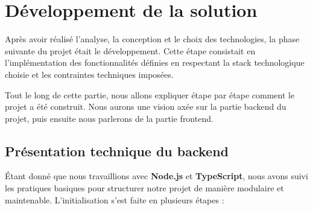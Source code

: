 \section{Développement de la solution} \label{developement_solution}

Après avoir réalisé l’analyse, la conception et le choix des technologies, la phase suivante du projet était le développement. Cette étape consistait en l’implémentation des fonctionnalités définies en respectant la stack technologique choisie et les contraintes techniques imposées.

\vspace{0.35cm}

Tout le long de cette partie, nous allons expliquer étape par étape comment le projet a été construit. Nous  aurons une vision axée sur la partie backend du projet, puis ensuite nous parlerons de la partie frontend.

\subsection*{Présentation technique du backend} \label{architecture_backend}

Étant donné que nous travaillions avec \textbf{Node.js} et \textbf{TypeScript}, nous avons suivi les pratiques basiques pour structurer notre projet de manière modulaire et maintenable. L’initialisation s’est faite en plusieurs étapes :

